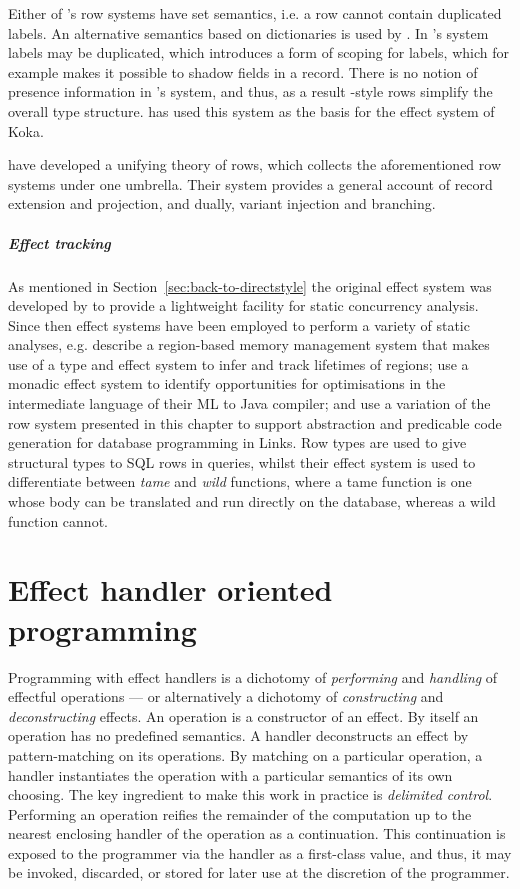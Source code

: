 \documentclass[12pt,phd,lfcs,twoside,openright,logo,leftchapter,normalheadings]{infthesis}
\theoremstyle{plain}
\theoremstyle{definition}
\begin{document}
Either of \citeauthor{Remy94}'s row systems have set semantics, i.e. a
row cannot contain duplicated labels. An alternative semantics based
on dictionaries is used by \citet{Leijen05}. In
\citeauthor{Leijen05}'s system labels may be duplicated, which
introduces a form of scoping for labels, which for example makes it
possible to shadow fields in a record. There is no notion of presence
information in \cite{Leijen05}'s system, and thus, as a result
\citeauthor{Leijen05}-style rows simplify the overall type structure.
\citet{Leijen14} has used this system as the basis for the effect
system of Koka.

\citet{MorrisM19} have developed a unifying theory of rows, which
collects the aforementioned row systems under one umbrella. Their
system provides a general account of record extension and projection,
and dually, variant injection and branching.

\paragraph{Effect tracking} As mentioned in
Section~\ref{sec:back-to-directstyle} the original effect system was
developed by \citet{LucassenG88} to provide a lightweight facility for
static concurrency analysis. Since then effect systems have been
employed to perform a variety of static analyses,
e.g. \citet{TofteT94,TofteT97} describe a region-based memory
management system that makes use of a type and effect system to infer
and track lifetimes of regions; \citet{BentonK99} use a monadic effect
system to identify opportunities for optimisations in the intermediate
language of their ML to Java compiler;
%
and \citet{LindleyC12} use a variation of the row system presented in
this chapter to support abstraction and predicable code generation for
database programming in Links. Row types are used to give structural
types to SQL rows in queries, whilst their effect system is used to
differentiate between \emph{tame} and \emph{wild} functions, where a
tame function is one whose body can be translated and run directly on
the database, whereas a wild function cannot.


\chapter{Effect handler oriented programming}
\label{ch:unary-handlers}
%
Programming with effect handlers is a dichotomy of \emph{performing}
and \emph{handling} of effectful operations --- or alternatively a
dichotomy of \emph{constructing} and \emph{deconstructing} effects. An
operation is a constructor of an effect. By itself an operation has no
predefined semantics. A handler deconstructs an effect by
pattern-matching on its operations. By matching on a particular
operation, a handler instantiates the operation with a particular
semantics of its own choosing. The key ingredient to make this work in
practice is \emph{delimited control}. Performing an operation reifies
the remainder of the computation up to the nearest enclosing handler
of the operation as a continuation. This continuation is exposed to
the programmer via the handler as a first-class value, and thus, it
may be invoked, discarded, or stored for later use at the discretion
of the programmer.
\end{document}

